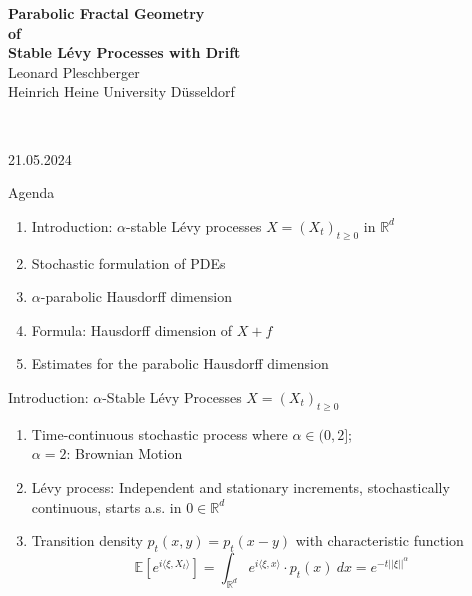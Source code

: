 \documentclass{beamer}
\theoremstyle{plain}
\theoremstyle{definition}
\theoremstyle{remark}
\newcommand{\Rd}{{\mathbb R^d}}
\newcommand{\1}{\mathbbm{1}}
\newcommand{\E}{{\mathbb E}}
\begin{document}
\begin{frame}
\thispagestyle{empty}
\begin{center}
\textbf{{\LARGE Parabolic Fractal Geometry \\[12pt] of \\ [12pt] Stable L\'{e}vy Processes with Drift}}\\[42pt]

Leonard Pleschberger\\[12pt]
Heinrich Heine University D\"{u}sseldorf

\quad\\[50pt]

\date{mylongdate}{21.}{05.}{2024}\\[12pt]

\end{center}
\end{frame}

\thispagestyle{empty}


\begin{frame}{Agenda}
\begin{enumerate}
\item Introduction: $\alpha$-stable L\'{e}vy processes $X = (X_t)_{t\geq0}$ in $\Rd$\\[12pt]
\item Stochastic formulation of PDEs\\[12pt]
\item $\alpha$-parabolic Hausdorff dimension\\[12pt]
\item Formula: Hausdorff dimension of $X +f$\\[12pt]
\item Estimates for the parabolic Hausdorff dimension
\end{enumerate}
\end{frame}


\begin{frame}{Introduction: $\alpha$-Stable L\'{e}vy Processes $X = (X_t)_{t\geq0}$}
\begin{enumerate}
\item Time-continuous stochastic process where $\alpha \in (0,2]$;\\ $\alpha = 2$: Brownian Motion \\[12pt]
\item L\'{e}vy process: Independent and stationary increments, stochastically continuous, starts a.s. in $0 \in \Rd$\\[12pt]
\item Transition density $p_t(x,y) = p_t(x-y)$ with characteristic function $$\E \left[ e^{i \langle \xi,X_t \rangle}\right] =  \int_\Rd e^{i \langle \xi,x \rangle}  \cdot p_t(x)\ dx = e^{-t||\xi||^\alpha}$$\\[12pt]
\end{enumerate}
\end{frame}
\end{document}
